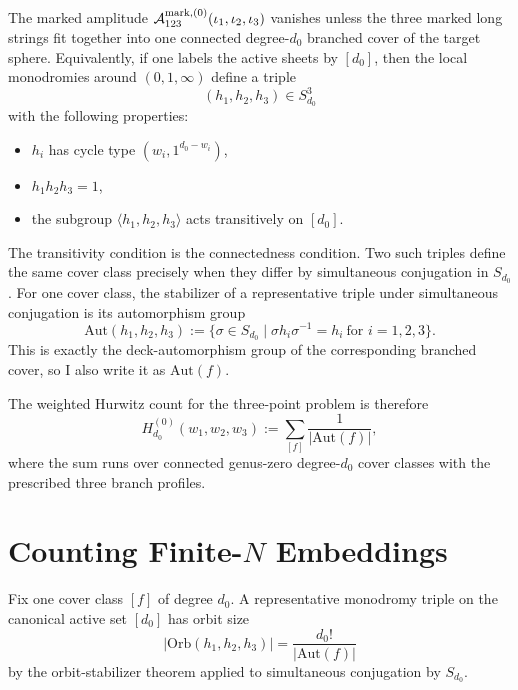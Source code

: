 \documentclass[11pt]{article}
\newcommand{\mc}[1]{\mathcal{#1}}
\newcommand{\Aut}{\mathrm{Aut}}
\begin{document}
The marked amplitude $\mc A_{123}^{\rm mark,(0)}(\iota_1,\iota_2,\iota_3)$ vanishes unless the three marked long strings fit together into one connected degree-$d_0$ branched cover of the target sphere. Equivalently, if one labels the active sheets by $[d_0]$, then the local monodromies around $(0,1,\infty)$ define a triple
\begin{equation}\label{eq:connected-monodromy-triple}
(h_1,h_2,h_3)\in S_{d_0}^3
\end{equation}
with the following properties:
\begin{itemize}
\item $h_i$ has cycle type $(w_i,1^{d_0-w_i})$,
\item $h_1h_2h_3=1$,
\item the subgroup $\langle h_1,h_2,h_3\rangle$ acts transitively on $[d_0]$.
\end{itemize}
The transitivity condition is the connectedness condition. Two such triples define the same cover class precisely when they differ by simultaneous conjugation in $S_{d_0}$. For one cover class, the stabilizer of a representative triple under simultaneous conjugation is its automorphism group
\begin{equation}\label{eq:cover-automorphism-group}
\Aut(h_1,h_2,h_3)
:=
\{\sigma\in S_{d_0}\mid \sigma h_i\sigma^{-1}=h_i\ \text{for }i=1,2,3\}.
\end{equation}
This is exactly the deck-automorphism group of the corresponding branched cover, so I also write it as $\Aut(f)$.

The weighted Hurwitz count for the three-point problem is therefore
\begin{equation}\label{eq:hurwitz-weighted}
H_{d_0}^{(0)}(w_1,w_2,w_3)
:=
\sum_{[f]}
\frac{1}{|\Aut(f)|},
\end{equation}
where the sum runs over connected genus-zero degree-$d_0$ cover classes with the prescribed three branch profiles.

\section{Counting Finite-\texorpdfstring{$N$}{N} Embeddings}
Fix one cover class $[f]$ of degree $d_0$. A representative monodromy triple on the canonical active set $[d_0]$ has orbit size
\begin{equation}\label{eq:orbit-size}
|\mathrm{Orb}(h_1,h_2,h_3)|
=
\frac{d_0!}{|\Aut(f)|}
\end{equation}
by the orbit-stabilizer theorem applied to simultaneous conjugation by $S_{d_0}$.
\end{document}
